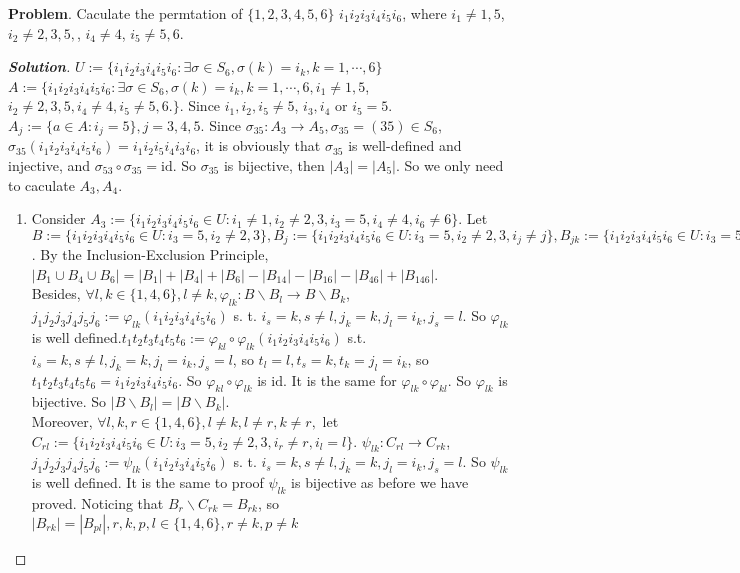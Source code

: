 \documentclass{ctexart}
\newcounter{problem}
\renewcommand{\theproblem}{\Roman{problem}}
\newenvironment{problem}{\refstepcounter{problem}\noindent\color{blue}\textbf{Problem}\theproblem.}{}
\newenvironment{solution}{\begin{proof}[\textbf{Solution}]}{\end{proof}}
\renewcommand\phi{\varphi}
\renewcommand{\(}{\left(}
\renewcommand{\)}{\right)}
\newcommand{\minus}{\mathbin{\backslash}}
\newcommand{\id}{\mathrm{id}}
\begin{document}
\begin{problem}
Caculate the permtation of $\{1,2,3,4,5,6\}$ $i_1i_2i_3i_4i_5i_6$, where $i_1\neq1,5$, $i_2\neq 2,3,5,$, $i_4\neq4$, $i_5\neq 5,6$. 
\end{problem}
\begin{solution}
	$U:=\{i_1i_2i_3i_4i_5i_6: \exists \sigma\in S_6, \sigma(k)=i_k, k=1,\cdots, 6\}$
	$A:=\{i_1i_2i_3i_4i_5i_6: \exists \sigma\in S_6, \sigma(k)=i_k, k=1,\cdots, 6,i_1\neq1,5$, $i_2\neq 2,3,5, i_4\neq4, i_5\neq 5,6. \}$. 
	Since $i_1,i_2,i_5\neq 5$, $i_3, i_4$ or $i_5=5$. $A_{j}:=\{a\in A: i_j=5\}, j=3,4,5$. 
	Since $\sigma_{35}: A_{3}\to A_{5},\sigma_{35}=(35)\in S_6$, $\sigma_{35}(i_1i_2i_3i_4i_5i_6)=i_1i_2i_{5}i_4i_{3}i_6$, it is obviously that $\sigma_{35}$ is well-defined and injective, and $\sigma_{53}\circ \sigma_{35}=\id$. So $\sigma_{35}$ is bijective, then $|A_{3}|=|A_{5}|$.  So we only need to caculate $A_3,A_4$.
	\begin{enumerate}
		\item Consider $A_{3}:=\{i_1i_2i_3i_4i_5i_6\in U: i_1\neq 1, i_2\neq 2,3,i_3=5,i_4\neq 4,i_6\neq 6\}$. Let $B:=\{i_1i_2i_3i_4i_5i_6\in U: i_3=5,i_2\neq 2,3 \}, B_{j}:=\{i_1i_2i_3i_4i_5i_6\in U: i_3=5,i_2\neq 2,3, i_j\neq j\},B_{jk}:=\{i_1i_2i_3i_4i_5i_6\in U: i_3=5,i_2\neq 2,3, i_t\neq t, t=j,k\},B_{jkl}:=\{i_1i_2i_3i_4i_5i_6\in U: i_3=5,i_2\neq 2,3, i_t\neq t, t=j,k,l\}$. By the Inclusion-Exclusion Principle, $|B_1\cup B_4\cup B_6|=|B_1|+|B_4|+|B_6|-|B_{14}|-|B_{16}|-|B_{46}|+|B_{146}|$. \\
		Besides, $\forall l,k\in\{1,4,6\},l\neq k, \phi_{lk}: B\minus B_l\to B\minus B_k$, $j_1j_2j_3j_4j_5j_6:=\phi_{lk}(i_1i_2i_3i_4i_5i_6)$ s. t. $i_s=k, s\neq l, j_k=k, j_l=i_k, j_s=l$. So $\phi_{lk}$ is well defined.$t_1t_2t_3t_4t_5t_6:=\phi_{kl}\circ \phi_{lk}(i_1i_2i_3i_4i_5i_6)$ s.t. $i_s=k, s\neq l, j_k=k, j_l=i_k, j_s=l$, so $t_l=l, t_s=k, t_k=j_l=i_k$, so $t_1t_2t_3t_4t_5t_6=i_1i_2i_3i_4i_5i_6$. So $\phi_{kl}\circ \phi_{lk}$ is $\id$. It is the same for  $\phi_{lk}\circ \phi_{kl}$. So $\phi_{lk}$ is bijective. So $|B\minus B_l|=|B\minus B_k|$.\\
		Moreover, $\forall l,k,r\in\{1,4,6\}, l\neq k, l\neq r, k\neq r,$ let $C_{rl}:=\{i_1i_2i_3i_4i_5i_6\in U: i_3=5,i_2\neq 2,3, i_r\neq r, i_l=l\}$. $ \psi_{lk}: C_{rl}\to C_{rk}$, $j_1j_2j_3j_4j_5j_6:=\psi_{lk}(i_1i_2i_3i_4i_5i_6)$ s. t. $i_s=k, s\neq l, j_k=k, j_l=i_k, j_s=l$. So $\psi_{lk}$ is well defined. It is the same to proof $\psi_{lk}$ is bijective as before we have proved. Noticing that $B_{r}\minus C_{rk}= B_{rk}$, so $|B_{rk}|=|B_{pl}|, r,k,p,l\in\{1,4,6\}, r\neq k, p\neq k$\\

\end{enumerate}
\end{solution}
\end{document}
